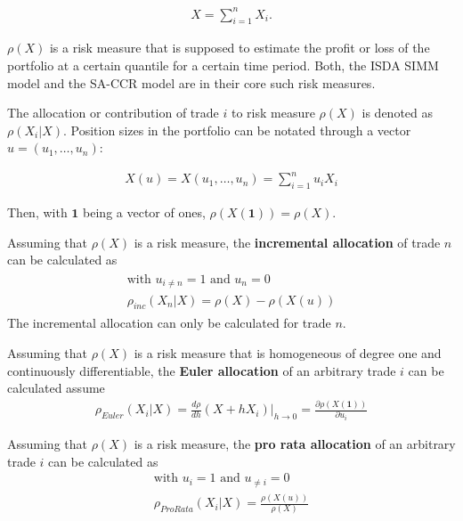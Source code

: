 \documentclass[../Thesis_AHoecherl.tex]{subfiles}
\begin{document}
\begin{align}
    X = \sum_{i=1}^n{X_i} \text{.}
\end{align}

$\rho(X)$ is a risk measure that is supposed to estimate the profit or loss of the portfolio at a certain quantile for a certain time period. 
Both, the \gls{ISDA SIMM} model and the \gls{SA-CCR} model are in their core such risk measures.

The allocation or contribution of trade $i$ to risk measure $\rho(X)$ is denoted as $\rho\left(X_i|X\right)$. Position sizes in the portfolio can be notated through a vector $u = (u_1,\dots, u_n)$:

\begin{align}
    X(u) = X(u_1, \dots, u_n) = \sum_{i=1}^{n}{u_iX_i}
\end{align}

Then, with $\mathbf{1}$ being a vector of ones, $\rho\left(X\left(\mathbf{1}\right)\right) = \rho\left(X\right)$.

\begin{definition}
    Assuming that $\rho\left(X\right)$ is a risk measure, the \textbf{incremental allocation} of trade $n$ can be calculated as
    \begin{gather}
        \begin{split}
            \text{with } u_{i\neq n} = 1 \text{ and }u_n = 0\\
            \rho_{inc}\left(X_n|X\right) = \rho\left(X\right) - \rho\left(X\left(u\right)\right)    
        \end{split}
    \end{gather}
    The incremental allocation can only be calculated for trade $n$.
\end{definition}

\begin{definition}
    Assuming that $\rho\left(X\right)$ is a risk measure that is homogeneous of degree one and continuously differentiable, the \textbf{Euler allocation} of an arbitrary trade $i$ can be calculated assume
    \begin{gather}
        \rho_{Euler}\left(X_i|X\right) = \frac{d\rho}{dh}\left(X+hX_i\right)|_{h\rightarrow0} = \frac{\partial \rho(X(\mathbf{1}))}{\partial u_i}
    \end{gather}
\end{definition}

\begin{definition}[\label{def:pro rata allocation}]
    Assuming that $\rho\left(X\right)$ is a risk measure, the \textbf{pro rata allocation} of an arbitrary trade $i$ can be calculated as
    \begin{gather}
        \text{with } u_{i} = 1 \text{ and } u_{\neq i} = 0\\
        \rho_{ProRata}\left(X_i|X\right) = \frac{\rho(X(u))}{\rho(X)}
    \end{gather}
\end{definition}
\end{document}

